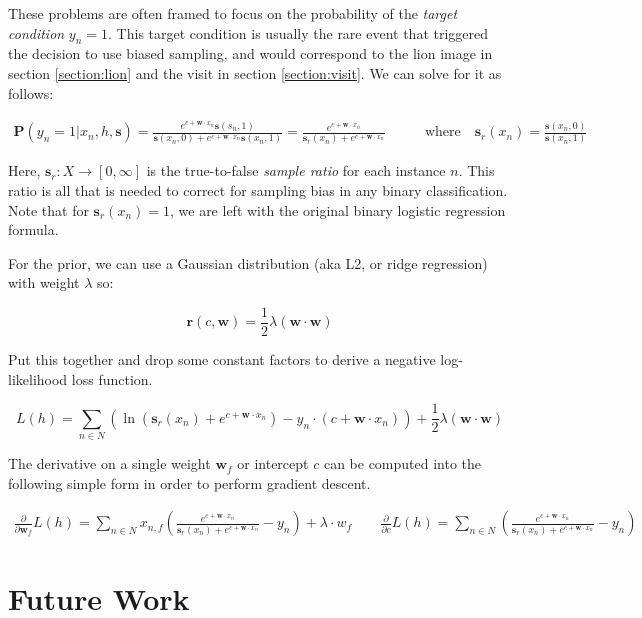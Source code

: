 \documentclass[twoside]{article}
\begin{document}
These problems are often framed to focus on the probability of the \textit{target condition} \(y_n = 1\). This target condition is usually the rare event that triggered the decision to use biased sampling, and would correspond to the lion image in section \ref{section:lion} and the visit in section \ref{section:visit}. We can solve for it as follows:

\begin{align}
\mathbf{P}(y_n=1|x_n,h,\mathbf{s})=\frac{e^{c+\mathbf{w} \cdot x_n}\mathbf{s}(s_n,1)}{\mathbf{s}(x_n,0)+e^{c+\mathbf{w} \cdot x_n}\mathbf{s}(x_n,1)}=\frac{e^{c+\mathbf{w} \cdot x_n}}{\mathbf{s}_r(x_n)+e^{c+\mathbf{w} \cdot x_n}} &
\qquad \textrm{where} \quad \mathbf{s}_r(x_n)=\frac{\mathbf{s}(x_n, 0)}{\mathbf{s}(x_n, 1)}
\end{align}

Here, \(\mathbf{s}_r: X \to [0, \infty]\) is the true-to-false \textit{sample ratio} for each instance \(n\). This ratio is all that is needed to correct for sampling bias in any binary classification. Note that for \(\mathbf{s}_r(x_n)=1\), we are left with the original binary logistic regression formula.

For the prior, we can use a Gaussian distribution (aka L2, or ridge regression) with weight \(\lambda\) so:

\[\mathbf{r}(c,\mathbf{w})=\frac{1}{2}\lambda(\mathbf{w} \cdot \mathbf{w})\]

Put this together and drop some constant factors to derive a negative log-likelihood loss function.

\[L(h)=\sum_{n \in  N} \left (\ln\left (\mathbf{s}_r(x_n)+e^{c+\mathbf{w} \cdot x_n}\right ) -y_n \cdot (c+\mathbf{w} \cdot x_n) \right )+ \frac{1}{2}\lambda(\mathbf{w} \cdot \mathbf{w})\]

The derivative on a single weight \(\mathbf{w}_f\) or intercept \(c\) can be computed into the following simple form in order to perform gradient descent.

\begin{align}
\frac{\partial}{\partial \mathbf{w}_f }L(h)=\sum_{n \in  N} x_{n,f}\left(\frac{e^{c+\mathbf{w} \cdot x_n}}{\mathbf{s}_r(x_n)+e^{c+\mathbf{w} \cdot x_n}} -y_n  \right )+ \lambda \cdot w_f
\qquad \frac{\partial}{\partial c}L(h)=\sum_{n \in  N} \left(\frac{e^{c+\mathbf{w} \cdot x_n}}{\mathbf{s}_r(x_n)+e^{c+\mathbf{w} \cdot x_n}}  -y_n\right )
\end{align}

\section{Future Work}
\label{section:future_work}
\end{document}
